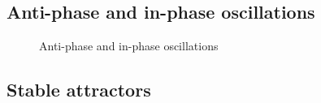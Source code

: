 \documentclass[12pt,twoside]{article}
\theoremstyle{plain}
\theoremstyle{definition}
\theoremstyle{remark}
\begin{document}
\subsection{Anti-phase and in-phase oscillations}

\begin{figure}[htbp]
\centering     %
{}
\caption{Anti-phase and in-phase oscillations}
\label{fig:in-anti-phase}
\end{figure}

\subsection{Stable attractors}
\end{document}
